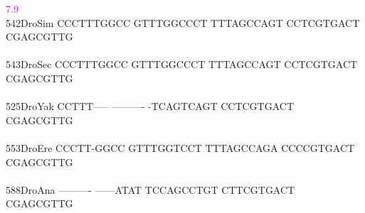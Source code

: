\documentclass[11pt,twoside,reqno,a4paper]{article}
\begin{document}
{\hspace*{4\charwidth}\hspace*{7\charwidth}\hspace*{9\charwidth}\textcolor{magenta}{7.9}\hspace*{1\charwidth}\hspace*{1\charwidth}\hspace*{1\charwidth}\hspace*{1\charwidth}\\
542\hspace*{1\charwidth}DroSim	CCCTTTGGCC	GTTTGGCCCT	TTTAGCCAGT	CCTCGTGACT	CGAGCGTTG\\
\hspace*{4\charwidth}\hspace*{7\charwidth}\hspace*{1\charwidth}\hspace*{1\charwidth}\hspace*{1\charwidth}\hspace*{1\charwidth}\\
543\hspace*{1\charwidth}DroSec	CCCTTTGGCC	GTTTGGCCCT	TTTAGCCAGT	CCTCGTGACT	CGAGCGTTG\\
\hspace*{4\charwidth}\hspace*{7\charwidth}\hspace*{1\charwidth}\hspace*{1\charwidth}\hspace*{1\charwidth}\hspace*{1\charwidth}\\
525\hspace*{1\charwidth}DroYak	CCTTT-----	----------	-TCAGTCAGT	CCTCGTGACT	CGAGCGTTG\\
\hspace*{4\charwidth}\hspace*{7\charwidth}\hspace*{1\charwidth}\hspace*{1\charwidth}\hspace*{1\charwidth}\hspace*{1\charwidth}\\
553\hspace*{1\charwidth}DroEre	CCCTT-GGCC	GTTTGGTCCT	TTTAGCCAGA	CCCCGTGACT	CGAGCGTTG\\
\hspace*{4\charwidth}\hspace*{7\charwidth}\hspace*{1\charwidth}\hspace*{1\charwidth}\hspace*{1\charwidth}\hspace*{1\charwidth}\\
588\hspace*{1\charwidth}DroAna	----------	------ATAT	TCCAGCCTGT	CTTCGTGACT	CGAGCGTTG\\
\hspace*{4\charwidth}\hspace*{7\charwidth}\hspace*{1\charwidth}\hspace*{1\charwidth}\hspace*{1\charwidth}\hspace*{1\charwidth}\\
\\
}
\end{document}
